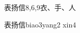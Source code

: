 \begin{entry}{表扬信}{8,6,9}{⾐、⼿、⼈}
  \begin{phonetics}{表扬信}{biao3yang2 xin4}
  \end{phonetics}
\end{entry}
